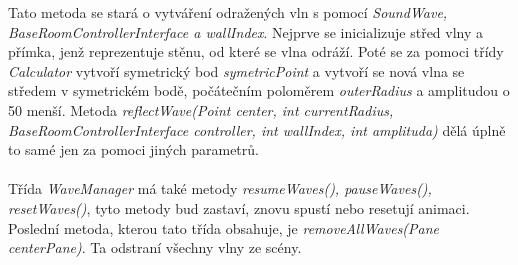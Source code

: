Tato metoda se stará o vytváření odražených vln s pomocí \textit{SoundWave, BaseRoomControllerInterface a wallIndex}.  Nejprve se inicializuje střed vlny a  přímka, jenž reprezentuje stěnu, od které se vlna odráží. Poté se za pomoci třídy \textit{Calculator} vytvoří symetrický bod \textit{symetricPoint} a vytvoří se nová vlna se středem v symetrickém bodě, počátečním poloměrem \textit{outerRadius} a amplitudou o 50 menší. Metoda \textit{reflectWave(Point center, int currentRadius, BaseRoomControllerInterface controller, int wallIndex, int amplituda)} dělá úplně to samé jen za pomoci jiných parametrů.\\
\\
Třída \textit{WaveManager} má také metody \textit{resumeWaves(), pauseWaves(), resetWaves()}, tyto metody bud zastaví, znovu spustí nebo resetují animaci. Poslední metoda, kterou tato třída obsahuje, je  \textit{removeAllWaves(Pane centerPane)}. Ta odstraní všechny vlny ze scény.